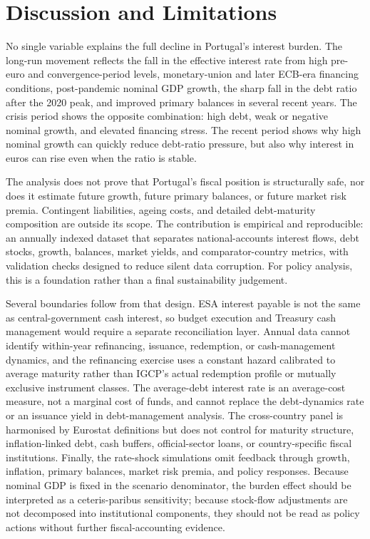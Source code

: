 \documentclass[11pt,a4paper]{article}
\begin{document}
\section{Discussion and Limitations}

No single variable explains the full decline in Portugal's interest burden.
The long-run movement reflects the fall in the effective interest rate from
high pre-euro and convergence-period levels, monetary-union and later ECB-era
financing conditions, post-pandemic nominal GDP growth, the sharp fall in the
debt ratio after the 2020 peak, and improved primary balances in several recent
years. The crisis period shows the opposite combination: high debt, weak or
negative nominal growth, and elevated financing stress. The recent period shows
why high nominal growth can quickly reduce debt-ratio pressure, but also why
interest in euros can rise even when the ratio is stable.

The analysis does not prove that Portugal's fiscal position is structurally
safe, nor does it estimate future growth, future primary balances, or future
market risk premia. Contingent liabilities, ageing costs, and detailed
debt-maturity composition are outside its scope. The contribution is empirical
and reproducible: an annually indexed dataset that separates national-accounts
interest flows, debt stocks, growth, balances, market yields, and
comparator-country metrics, with validation checks designed to reduce silent
data corruption. For policy analysis, this is a foundation rather than a final
sustainability judgement.

Several boundaries follow from that design. ESA interest payable is not the
same as central-government cash interest, so budget execution and Treasury cash
management would require a separate reconciliation layer. Annual data cannot
identify within-year refinancing, issuance, redemption, or cash-management
dynamics, and the refinancing exercise uses a constant hazard calibrated to
average maturity rather than IGCP's actual redemption profile or mutually
exclusive instrument classes. The
average-debt interest rate is an average-cost measure, not a marginal cost of
funds, and cannot replace the debt-dynamics rate or an issuance yield in
debt-management analysis. The cross-country panel is harmonised by Eurostat
definitions but does not control for maturity structure, inflation-linked debt,
cash buffers, official-sector loans, or country-specific fiscal institutions.
Finally, the rate-shock simulations omit feedback through growth, inflation,
primary balances, market risk premia, and policy responses. Because nominal GDP
is fixed in the scenario denominator, the burden effect should be interpreted
as a ceteris-paribus sensitivity; because
stock-flow adjustments are not decomposed into institutional components, they
should not be read as policy actions without further fiscal-accounting evidence.
\end{document}
